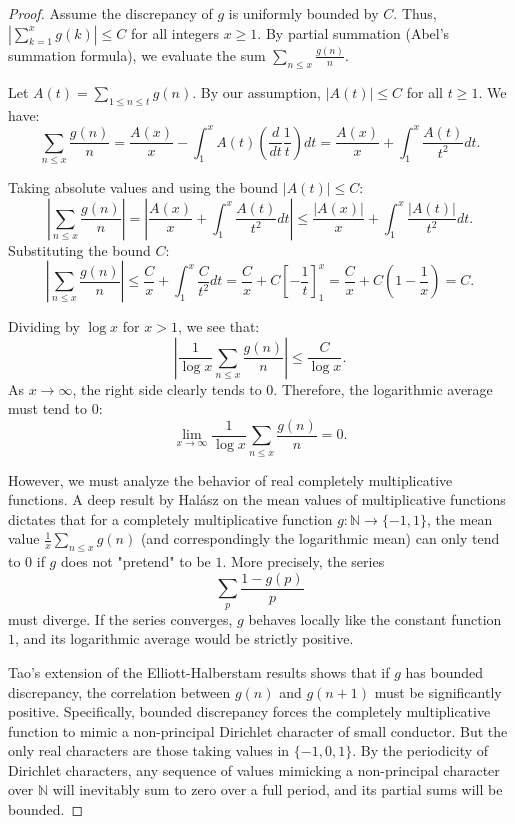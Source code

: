 \documentclass[12pt]{article}
\begin{document}
\begin{proof}
Assume the discrepancy of $g$ is uniformly bounded by $C$. Thus, $\left| \sum_{k=1}^x g(k) \right| \leq C$ for all integers $x \geq 1$. By partial summation (Abel's summation formula), we evaluate the sum $\sum_{n \leq x} \frac{g(n)}{n}$.

Let $A(t) = \sum_{1 \leq n \leq t} g(n)$. By our assumption, $|A(t)| \leq C$ for all $t \geq 1$. We have:
\[
\sum_{n \leq x} \frac{g(n)}{n} = \frac{A(x)}{x} - \int_{1}^{x} A(t) \left( \frac{d}{dt} \frac{1}{t} \right) dt = \frac{A(x)}{x} + \int_{1}^{x} \frac{A(t)}{t^2} dt.
\]

Taking absolute values and using the bound $|A(t)| \leq C$:
\[
\left| \sum_{n \leq x} \frac{g(n)}{n} \right| = \left| \frac{A(x)}{x} + \int_{1}^{x} \frac{A(t)}{t^2} dt \right| \leq \frac{|A(x)|}{x} + \int_{1}^{x} \frac{|A(t)|}{t^2} dt.
\]
Substituting the bound $C$:
\[
\left| \sum_{n \leq x} \frac{g(n)}{n} \right| \leq \frac{C}{x} + \int_{1}^{x} \frac{C}{t^2} dt = \frac{C}{x} + C\left[ -\frac{1}{t} \right]_{1}^{x} = \frac{C}{x} + C\left( 1 - \frac{1}{x} \right) = C.
\]

Dividing by $\log x$ for $x > 1$, we see that:
\[
\left| \frac{1}{\log x} \sum_{n \leq x} \frac{g(n)}{n} \right| \leq \frac{C}{\log x}.
\]
As $x \to \infty$, the right side clearly tends to $0$. Therefore, the logarithmic average must tend to $0$:
\[
\lim_{x \to \infty} \frac{1}{\log x} \sum_{n \leq x} \frac{g(n)}{n} = 0.
\]

However, we must analyze the behavior of real completely multiplicative functions. A deep result by Halász on the mean values of multiplicative functions dictates that for a completely multiplicative function $g: \mathbb{N} \to \{-1, 1\}$, the mean value $\frac{1}{x} \sum_{n \leq x} g(n)$ (and correspondingly the logarithmic mean) can only tend to $0$ if $g$ does not "pretend" to be $1$. More precisely, the series
\[
\sum_{p} \frac{1 - g(p)}{p}
\]
must diverge. If the series converges, $g$ behaves locally like the constant function $1$, and its logarithmic average would be strictly positive.

Tao's extension of the Elliott-Halberstam results shows that if $g$ has bounded discrepancy, the correlation between $g(n)$ and $g(n+1)$ must be significantly positive. Specifically, bounded discrepancy forces the completely multiplicative function to mimic a non-principal Dirichlet character of small conductor. But the only real characters are those taking values in $\{-1, 0, 1\}$. By the periodicity of Dirichlet characters, any sequence of values mimicking a non-principal character over $\mathbb{N}$ will inevitably sum to zero over a full period, and its partial sums will be bounded.


\end{proof}
\end{document}
